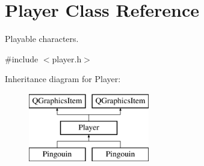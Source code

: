 \hypertarget{class_player}{}\section{Player Class Reference}
\label{class_player}


Playable characters.  




{\ttfamily \#include $<$player.\+h$>$}

Inheritance diagram for Player\+:\begin{figure}[H]
\begin{center}
\leavevmode
\includegraphics[height=3.000000cm]{class_player}
\end{center}
\end{figure}
